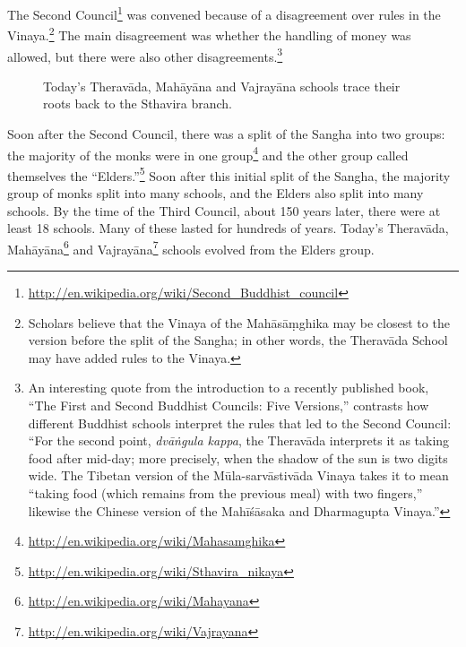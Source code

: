 The Second Council\footnote{\url{http://en.wikipedia.org/wiki/Second_Buddhist_council}} was convened because of a disagreement over rules in the Vinaya.\footnote{Scholars believe that the Vinaya of the Mahāsāṃghika may be closest to the version before the split of the Sangha; in other words, the Theravāda School may have added rules to the Vinaya.} The main disagreement was whether the handling of money was allowed, but there were also other disagreements.\footnote{An interesting quote from the introduction to a recently published book, “The First and Second Buddhist Councils: Five Versions,” contrasts how different Buddhist schools interpret the rules that led to the Second Council: “For the second point, \textit{dvāṅgula kappa}, the Theravāda interprets it as taking food after mid-day; more precisely, when the shadow of the sun is two digits wide. The Tibetan version of the Mūla-sarvāstivāda Vinaya takes it to mean “taking food (which remains from the previous meal) with two fingers,” likewise the Chinese version of the Mahīśāsaka and Dharmagupta Vinaya.”}

\pagebreak

\begin{figure}[h]
\centering

\caption{Today’s Theravāda, Mahāyāna and Vajrayāna schools trace their roots back to the Sthavira branch.}
\label{fig:Schools}
\end{figure}

Soon after the Second Council, there was a split of the Sangha into two groups: the majority of the monks were in one group\footnote{\url{http://en.wikipedia.org/wiki/Mahasamghika}} and the other group called themselves the “Elders.”\footnote{\url{http://en.wikipedia.org/wiki/Sthavira_nikaya}} Soon after this initial split of the Sangha, the majority group of monks split into many schools, and the Elders also split into many schools. By the time of the Third Council, about 150 years later, there were at least 18 schools. Many of these lasted for hundreds of years. Today’s Theravāda, Mahāyāna\footnote{\url{http://en.wikipedia.org/wiki/Mahayana}} and Vajrayāna\footnote{\url{http://en.wikipedia.org/wiki/Vajrayana}} schools evolved from the Elders group.

